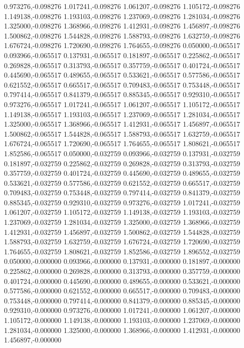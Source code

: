 0.973276,-0.098276
1.017241,-0.098276
1.061207,-0.098276
1.105172,-0.098276
1.149138,-0.098276
1.193103,-0.098276
1.237069,-0.098276
1.281034,-0.098276
1.325000,-0.098276
1.368966,-0.098276
1.412931,-0.098276
1.456897,-0.098276
1.500862,-0.098276
1.544828,-0.098276
1.588793,-0.098276
1.632759,-0.098276
1.676724,-0.098276
1.720690,-0.098276
1.764655,-0.098276
0.050000,-0.065517
0.093966,-0.065517
0.137931,-0.065517
0.181897,-0.065517
0.225862,-0.065517
0.269828,-0.065517
0.313793,-0.065517
0.357759,-0.065517
0.401724,-0.065517
0.445690,-0.065517
0.489655,-0.065517
0.533621,-0.065517
0.577586,-0.065517
0.621552,-0.065517
0.665517,-0.065517
0.709483,-0.065517
0.753448,-0.065517
0.797414,-0.065517
0.841379,-0.065517
0.885345,-0.065517
0.929310,-0.065517
0.973276,-0.065517
1.017241,-0.065517
1.061207,-0.065517
1.105172,-0.065517
1.149138,-0.065517
1.193103,-0.065517
1.237069,-0.065517
1.281034,-0.065517
1.325000,-0.065517
1.368966,-0.065517
1.412931,-0.065517
1.456897,-0.065517
1.500862,-0.065517
1.544828,-0.065517
1.588793,-0.065517
1.632759,-0.065517
1.676724,-0.065517
1.720690,-0.065517
1.764655,-0.065517
1.808621,-0.065517
1.852586,-0.065517
0.050000,-0.032759
0.093966,-0.032759
0.137931,-0.032759
0.181897,-0.032759
0.225862,-0.032759
0.269828,-0.032759
0.313793,-0.032759
0.357759,-0.032759
0.401724,-0.032759
0.445690,-0.032759
0.489655,-0.032759
0.533621,-0.032759
0.577586,-0.032759
0.621552,-0.032759
0.665517,-0.032759
0.709483,-0.032759
0.753448,-0.032759
0.797414,-0.032759
0.841379,-0.032759
0.885345,-0.032759
0.929310,-0.032759
0.973276,-0.032759
1.017241,-0.032759
1.061207,-0.032759
1.105172,-0.032759
1.149138,-0.032759
1.193103,-0.032759
1.237069,-0.032759
1.281034,-0.032759
1.325000,-0.032759
1.368966,-0.032759
1.412931,-0.032759
1.456897,-0.032759
1.500862,-0.032759
1.544828,-0.032759
1.588793,-0.032759
1.632759,-0.032759
1.676724,-0.032759
1.720690,-0.032759
1.764655,-0.032759
1.808621,-0.032759
1.852586,-0.032759
1.896552,-0.032759
0.050000,-0.000000
0.093966,-0.000000
0.137931,-0.000000
0.181897,-0.000000
0.225862,-0.000000
0.269828,-0.000000
0.313793,-0.000000
0.357759,-0.000000
0.401724,-0.000000
0.445690,-0.000000
0.489655,-0.000000
0.533621,-0.000000
0.577586,-0.000000
0.621552,-0.000000
0.665517,-0.000000
0.709483,-0.000000
0.753448,-0.000000
0.797414,-0.000000
0.841379,-0.000000
0.885345,-0.000000
0.929310,-0.000000
0.973276,-0.000000
1.017241,-0.000000
1.061207,-0.000000
1.105172,-0.000000
1.149138,-0.000000
1.193103,-0.000000
1.237069,-0.000000
1.281034,-0.000000
1.325000,-0.000000
1.368966,-0.000000
1.412931,-0.000000
1.456897,-0.000000
